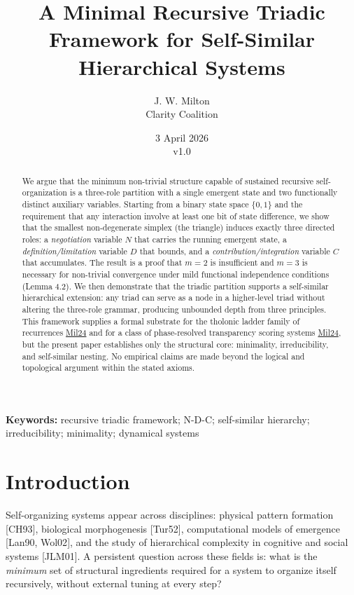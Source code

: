 \documentclass[12pt]{article}
\title{A Minimal Recursive Triadic Framework for Self-Similar Hierarchical Systems}
\author{J. W. Milton\\[4pt]{\small Clarity Coalition}}
\date{\small 3 April 2026 \\ v1.0}
\begin{document}
\maketitle

\noindent\textbf{Keywords:} recursive triadic framework; N-D-C; self-similar hierarchy; irreducibility; minimality; dynamical systems

\begin{abstract}
We argue that the minimum non-trivial structure capable of sustained
recursive self-organization is a three-role partition with a single
emergent state and two functionally distinct auxiliary variables.
Starting from a binary state space \(\{0, 1\}\) and the requirement that
any interaction involve at least one bit of state difference, we show
that the smallest non-degenerate simplex (the triangle) induces exactly
three directed roles: a \emph{negotiation} variable \(N\) that carries
the running emergent state, a \emph{definition/limitation} variable
\(D\) that bounds, and a \emph{contribution/integration} variable \(C\)
that accumulates. The result is a proof that \(m = 2\) is insufficient
and \(m = 3\) is necessary for non-trivial convergence under mild
functional independence conditions (Lemma 4.2). We then demonstrate that
the triadic partition supports a self-similar hierarchical extension:
any triad can serve as a node in a higher-level triad without altering
the three-role grammar, producing unbounded depth from three principles.
This framework supplies a formal substrate for the tholonic ladder
family of recurrences \href{https://tholonia.github.io/the-book/}{Mil24}
and for a class of phase-resolved transparency scoring systems
\href{https://tholonia.github.io/the-book/}{Mil24}, but the present
paper establishes only the structural core: minimality, irreducibility,
and self-similar nesting. No empirical claims are made beyond the
logical and topological argument within the stated axioms.
\end{abstract}

\section{Introduction}\label{introduction}

Self-organizing systems appear across disciplines: physical pattern
formation {[}CH93{]}, biological morphogenesis {[}Tur52{]},
computational models of emergence {[}Lan90, Wol02{]}, and the study of
hierarchical complexity in cognitive and social systems {[}JLM01{]}. A
persistent question across these fields is: what is the \emph{minimum}
set of structural ingredients required for a system to organize itself
recursively, without external tuning at every step?
\end{document}
